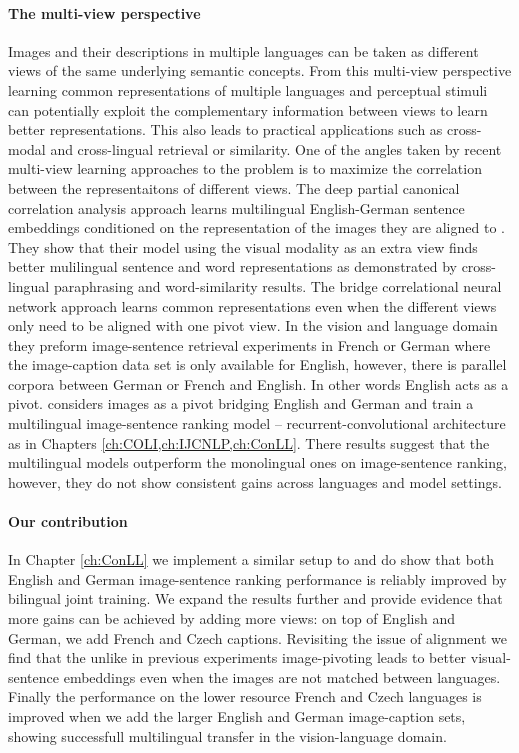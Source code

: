 \paragraph{The multi-view perspective}

Images and their descriptions in multiple languages can be taken as different views of the
same underlying semantic concepts. From this multi-view perspective learning common representations
of multiple languages and perceptual stimuli can potentially exploit the complementary information
between views to learn better representations. This also leads to practical applications such as
cross-modal and cross-lingual retrieval or similarity.
One of the angles taken by recent multi-view learning approaches to the problem
is to maximize the correlation between the representaitons of different views.
The deep partial canonical correlation
analysis approach learns multilingual English-German sentence embeddings conditioned on the
representation of the images they are aligned to \cite{rotman2018bridging}.
They show that their model using the visual modality as an extra view finds
better mulilingual sentence and word representations as demonstrated by
cross-lingual paraphrasing and word-similarity results.
The bridge correlational neural network approach \cite{rajendran2015bridge}
learns common representations even when the different views only need to be
aligned with one pivot view. In the vision and language domain they preform
image-sentence retrieval experiments in French or German where
the image-caption data set is only available for English, however,
there is parallel corpora between German or French and English. In other words English acts as a pivot.
\cite{gella2017image} considers images as a pivot bridging English and German and train a multilingual
image-sentence ranking model -- recurrent-convolutional architecture as in Chapters \ref{ch:COLI,ch:IJCNLP,ch:ConLL}.
There results suggest that the multilingual models outperform the monolingual ones on image-sentence
ranking, however, they do not show consistent gains across languages and model settings.

\paragraph{Our contribution}

In Chapter \ref{ch:ConLL} we implement a similar setup to \cite{gella2017image}
and do show that both English and German image-sentence
ranking performance is reliably improved by bilingual joint training.
We expand the results further and provide evidence that more gains can be
achieved by adding more views: on top of English and German, we
add French and Czech captions. Revisiting the issue of alignment we find that
the unlike in previous experiments \cite{gella2017image,calixto2017multilingual,rotman2018bridging}
image-pivoting leads to better visual-sentence embeddings even when the images
are not matched between languages. Finally the performance on the lower resource
French and Czech languages is improved when we add the larger
English and German image-caption sets, showing successfull multilingual
transfer in the vision-language domain.

